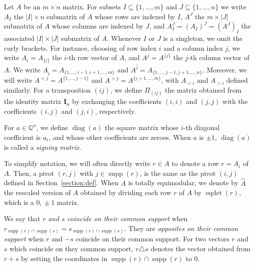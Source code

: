 \documentclass[11pt,a4paper]{amsart}
\theoremstyle{plain}
\theoremstyle{definition}
\newcommand{\Q}{\mathbb{Q}}
\DeclareMathOperator{\supp}{supp}
\DeclareMathOperator{\eqdet}{eqdet}
\DeclareMathOperator{\diag}{diag}
\begin{document}
Let $A$ be an $m\times n$ matrix.
For subsets $I\subseteq \{1,\dots,m\}$ and $J\subseteq \{1,\dots,n\}$ we write $A_I$ the $|I|\times n$ submatrix of $A$ whose rows are indexed by $I$, $A^J$ the $m\times |J|$ submatrix of $A$ whose columns are indexed by $J$, and $A^J_I=(A_I)^J=(A^J)_I$ the associated $|I|\times|J|$ submatrix of $A$.
Whenever $I$ or $J$ is a singleton, we omit the curly brackets. For instance, choosing of row index $i$ and a column index $j$, we write $A_i=A_{\{i\}}$ the $i$-th row vector of $A$, and $A^j=A^{\{j\}}$ the $j$-th column vector of $A$.
We write $A_{\widehat{i}}=A_{\{1,\ldots,i-1,i+1,\ldots,m\}}$ and $A^{\widehat{j}}=A_{\{1,\ldots,j-1,j+1,\ldots,n\}}$.
Moreover, we will write $A^{<j}=A^{\{1,\ldots,j-1\}}$ and $A^{>j}=A^{\{j+1,\ldots,m\}}$, with $A_{<i}$ and $A_{>i}$ defined similarly.
For a transposition $(ij)$, we define $\Pi_{(ij)}$ the matrix obtained from the identity matrix $\mathbf{I}_n$ by exchanging the coefficients $(i,i)$ and $(j,j)$ with the coefficients $(i,j)$ and $(j,i)$, respectively.

For $a\in \Q^n$, we define $\diag (a)$ the square matrix whose $i$-th diagonal coefficient is $a_i$, and whose other coefficients are zeroes.
When $a$ is $\pm 1$, $\diag(a)$ is called a \emph{signing matrix}.


To simplify notation, we will often directly write $r\in A$ to denote a row $r=A_i$ of $A$. Then, a pivot $(r,j)$ with $j\in \supp(r)$, is the same as the pivot $(i,j)$ defined in Section~\ref{section:def}.
When $A$ is totally equimodular, we denote by $\widehat{A}$ the rescaled version of $A$ obtained by dividing each row $r$ of $A$ by $\eqdet(r)$, which is a $0,\!\pm1$ matrix.





We say that {\em $r$ and $s$ coincide on their common support} when $r_{\supp(r)\cap\supp(s)}=s_{\supp(r)\cap\supp(s)}$.
They are {\em opposites on their common support} when $r$ and $-s$ coincide on their common support.
For two vectors $r$ and $s$ which coincide on they common support, $r\triangle s$ denotes the vector obtained from $r+s$ by setting the coordinates in $\supp(r)\cap \supp(r)$ to $0$.
\medskip
\end{document}
